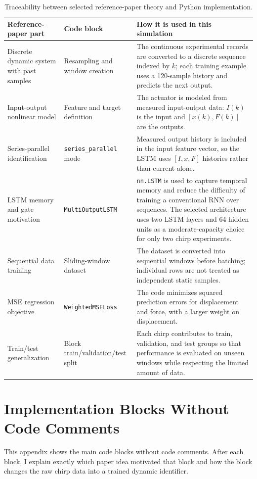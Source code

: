\documentclass[11pt]{article}
\begin{document}
\begin{table}[H]
\centering
\small
\begin{tabular}{p{3.4cm}p{3.7cm}p{7.2cm}}
\toprule
Reference-paper part & Code block & How it is used in this simulation \\
\midrule
Discrete dynamic system with past samples \cite{wang2017} & Resampling and window creation & The continuous experimental records are converted to a discrete sequence indexed by $k$; each training example uses a 120-sample history and predicts the next output. \\
Input-output nonlinear model \cite{wang2017} & Feature and target definition & The actuator is modeled from measured input-output data: $I(k)$ is the input and $[x(k),F(k)]$ are the outputs. \\
Series-parallel identification \cite{wang2017} & \texttt{series\_parallel} mode & Measured output history is included in the input feature vector, so the LSTM uses $[I,x,F]$ histories rather than current alone. \\
LSTM memory and gate motivation \cite{wang2017} & \texttt{MultiOutputLSTM} & \texttt{nn.LSTM} is used to capture temporal memory and reduce the difficulty of training a conventional RNN over sequences. The selected architecture uses two LSTM layers and 64 hidden units as a moderate-capacity choice for only two chirp experiments. \\
Sequential data training \cite{ogunmolu2016} & Sliding-window dataset & The dataset is converted into sequential windows before batching; individual rows are not treated as independent static samples. \\
MSE regression objective \cite{ogunmolu2016} & \texttt{WeightedMSELoss} & The code minimizes squared prediction errors for displacement and force, with a larger weight on displacement. \\
Train/test generalization \cite{ogunmolu2016} & Block train/validation/test split & Each chirp contributes to train, validation, and test groups so that performance is evaluated on unseen windows while respecting the limited amount of data. \\
\bottomrule
\end{tabular}
\caption{Traceability between selected reference-paper theory and Python implementation.}
\label{tab:traceability}
\end{table}

\appendix
\section{Implementation Blocks Without Code Comments}
This appendix shows the main code blocks without code comments. After each block, I explain exactly which paper idea motivated that block and how the block changes the raw chirp data into a trained dynamic identifier.
\end{document}

